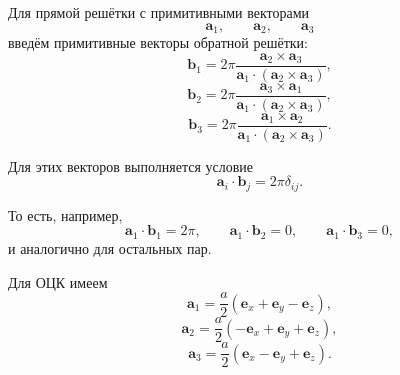 \documentclass[../final.tex]{subfiles}
\begin{document}
Для прямой решётки с примитивными векторами
%
\begin{equation*}
    \mathbf a_1,
    \qquad
    \mathbf a_2,
    \qquad
    \mathbf a_3
\end{equation*}
%
введём примитивные векторы обратной решётки:
%
\begin{equation*}
    \boxed{
        \mathbf b_1
        =
        2\pi
        \frac{
            \mathbf a_2\times\mathbf a_3
        }{
            \mathbf a_1\cdot
            (\mathbf a_2\times\mathbf a_3)
        }
    },
\end{equation*}
%
\begin{equation*}
    \boxed{
        \mathbf b_2
        =
        2\pi
        \frac{
            \mathbf a_3\times\mathbf a_1
        }{
            \mathbf a_1\cdot
            (\mathbf a_2\times\mathbf a_3)
        }
    },
\end{equation*}
%
\begin{equation*}
    \boxed{
        \mathbf b_3
        =
        2\pi
        \frac{
            \mathbf a_1\times\mathbf a_2
        }{
            \mathbf a_1\cdot
            (\mathbf a_2\times\mathbf a_3)
        }
    }.
\end{equation*}

Для этих векторов выполняется условие
%
\begin{equation*}
    \boxed{
        \mathbf a_i\cdot\mathbf b_j
        =
        2\pi\delta_{ij}
    }.
\end{equation*}

То есть, например,
%
\begin{equation*}
    \mathbf a_1\cdot\mathbf b_1=2\pi,
    \qquad
    \mathbf a_1\cdot\mathbf b_2=0,
    \qquad
    \mathbf a_1\cdot\mathbf b_3=0,
\end{equation*}
%
и аналогично для остальных пар.

Для ОЦК имеем
%
\begin{equation*}
    \mathbf a_1
    =
    \frac{a}{2}
    \left(
        \mathbf e_x+\mathbf e_y-\mathbf e_z
    \right),
\end{equation*}
%
\begin{equation*}
    \mathbf a_2
    =
    \frac{a}{2}
    \left(
        -\mathbf e_x+\mathbf e_y+\mathbf e_z
    \right),
\end{equation*}
%
\begin{equation*}
    \mathbf a_3
    =
    \frac{a}{2}
    \left(
        \mathbf e_x-\mathbf e_y+\mathbf e_z
    \right).
\end{equation*}
\end{document}
